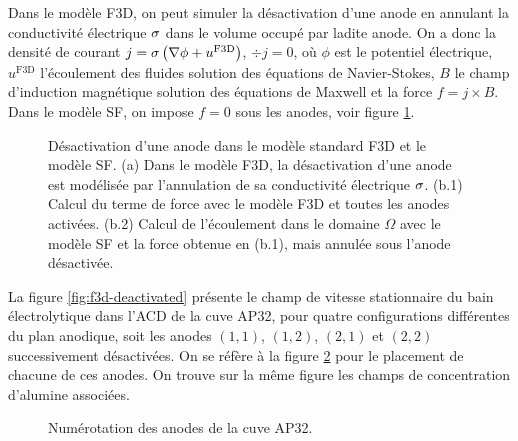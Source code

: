 Dans le modèle F3D, on peut simuler la désactivation d'une anode en
annulant la conductivité électrique $\sigma$ dans le volume
occupé par ladite anode. On a donc la densité de courant $j =
\sigma\left( \nabla \phi + u^\mathrm{F3D} \right)$, $\div j = 0$,
où $\phi$ est le potentiel électrique, $u^\mathrm{F3D}$
l'écoulement des fluides solution des équations de Navier-Stokes,
$B$ le champ d'induction magnétique solution des équations de
Maxwell et la force $f = j\times B$. Dans le modèle SF, on impose
$f = 0$ sous les anodes, voir figure \ref{fig:anode-deactivation}.

\begin{figure}
  \begin{center}
    
    \caption{Désactivation d'une anode dans le modèle standard F3D et
      le modèle SF. (a) Dans le modèle F3D, la désactivation d'une
      anode est modélisée par l'annulation de sa conductivité
      électrique $\sigma$. (b.1) Calcul du terme de force avec
      le modèle F3D et toutes les anodes activées. (b.2) Calcul de
      l'écoulement dans le domaine $\Omega$ avec le modèle SF et la
      force obtenue en (b.1), mais annulée sous l'anode désactivée.}
    \label{fig:anode-deactivation}
  \end{center}
\end{figure}
La figure \ref{fig:f3d-deactivated} présente
le champ de vitesse stationnaire du bain électrolytique dans l'ACD de
la cuve AP32, pour quatre configurations différentes du plan
anodique, soit les anodes $(1,1)$, $(1,2)$, $(2,1)$ et $(2,2)$
successivement désactivées. On se réfère à la figure
\ref{fig:anode-numerotations} pour le placement de chacune de ces anodes. On
trouve sur la même figure les champs de concentration d'alumine
associées.

\begin{figure}
  \begin{center}
    
    \caption{Numérotation des anodes de la cuve AP32.}
    \label{fig:anode-numerotations}
  \end{center}
\end{figure}

